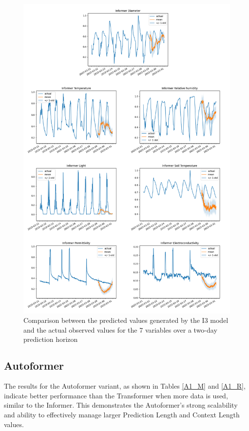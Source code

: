 \begin{figure}[htbp]
    \centering
    \includegraphics[width=15 cm]{6_ChapterResults/figuras/I3.png}
    \caption{Comparison between the predicted values generated by the I3 model and the actual observed values for the 7 variables over a two-day prediction horizon}
    \label{I3}
\end{figure}


\subsection{Autoformer}
The results for the Autoformer variant, as shown in Tables \ref{A1_M} and \ref{A1_R}, indicate better performance than the Transformer when more data is used, similar to the Informer. This demonstrates the Autoformer's strong scalability and ability to effectively manage larger Prediction Length and Context Length values.

